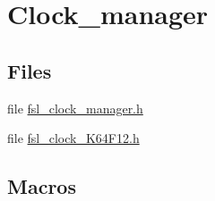 \hypertarget{group__clock__manager}{}\section{Clock\+\_\+manager}
\label{group__clock__manager}
\subsection*{Files}
\begin{DoxyCompactItemize}
\item 
file \hyperlink{fsl__clock__manager_8h}{fsl\+\_\+clock\+\_\+manager.\+h}
\item 
file \hyperlink{fsl__clock__K64F12_8h}{fsl\+\_\+clock\+\_\+\+K64\+F12.\+h}
\end{DoxyCompactItemize}
\subsection*{Macros}
